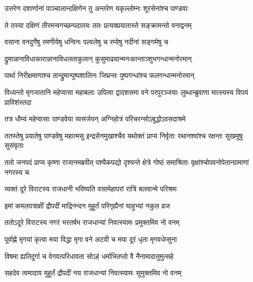 \twolineshloka
{उत्तरेण दशार्णानां पाञ्चालान्दक्षिणेन तु}
{अन्तरेण यकृल्लोम्नः शूरसेनांश्च पाण्डवाः}


\twolineshloka
{ते तस्या दक्षिणं तीरमन्वगच्छन्पदातयः}
{ततः प्रत्यक्प्रयातास्ते सङ्क्रामन्तो वनाद्वनम्}


\twolineshloka
{वसाना वनदुर्गेषु रमणीयेषु धन्विनः}
{पल्वलेषु च रम्येषु नदीनां सङ्गमेषु च}


\twolineshloka
{द्रुमान्नानाविधाकारान्नानाविधलताकुलान्}
{कुसुमाढ्यान्मनःकान्ताञ्शुभगन्धान्मनोरमान्}


\twolineshloka
{पार्था निरीक्षमाणाश्च तान्द्रुमान्पुष्पशालिनः}
{जिघ्रन्तः पुष्पगन्धांश्च फलगन्धान्मनोरमान्}


\threelineshloka
{विध्यन्तो मृगजातानि महेप्वासा महाबलाः}
{उपित्वा द्वादशसमा वने परपुरञ्जयाः}
{लुब्धान्ब्रुवाणा मात्स्यस्य विपयं प्राविशंस्तदा}


\twolineshloka
{तत्र धौम्यं महेप्वासाः पाण्डवेया व्यसर्जयन्}
{अग्निहोत्रं परिचरन्सोऽबुद्धोऽवसदाश्रमे}


\threelineshloka
{ततस्तेषु प्रयातेषु पाण्डवेषु महात्मसु}
{इन्द्रसेनमुखाश्चैव यथोक्तं प्राप्य निर्वृताः}
{रथानश्वांश्च रक्षन्तः सुखमूषुः सुसंवृताः}


\onelineshloka
{ततो जनपदं प्राप्य कृष्णा राजानमब्रवीत्}
\twolineshloka
{पश्यैकपद्यो दृश्यन्ते क्षेत्रे गोष्ठं समाश्रिताः}
{वृक्षांश्चोपवनोपेतान्ग्रामाणां नगरस्य च}


\twolineshloka
{व्यक्तं दूरे विराटस्य राजधानी भविष्यति}
{वसामेहापरां रात्रिं बलवान्मे परिश्रमः}




\twolineshloka
{इमां कमलपत्राक्षीं द्रौपदीं माद्रिनन्दन}
{मुहूर्तं परिगृह्यैनां घाहुभ्यां नकुल व्रज}


\twolineshloka
{ततोऽदूरे विराटस्य नगरं भरतर्षभ}
{राजधान्यां निवत्स्यामः प्रमुक्तमिव नो वनम्}




\twolineshloka
{पूर्वाह्णे मृगयां कृत्वा मया विद्धा मृगा वने}
{अटवी च मया दूरं धृता मृगवधेप्सुना}


\twolineshloka
{विषमा ह्यतिदुर्गा च वेगवत्परिधावता}
{सोऽहं धर्माभितप्तो वै नैनामादातुमुत्सहे}




\twolineshloka
{सहदेव त्वमादाय मुहूर्तं द्रौपदीं नय}
{राजधान्यां निवत्स्यामः सुमुक्तमिव नो वनम्}




